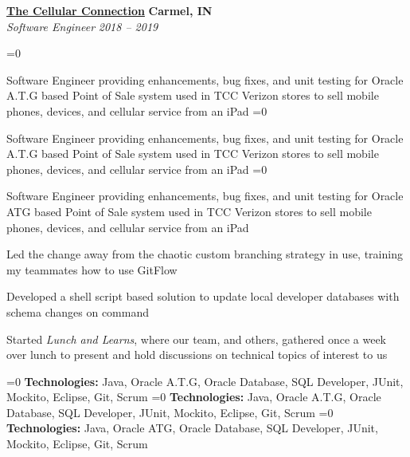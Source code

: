 %
    \headerrow
        {\textbf{\href{https://www.tccrocks.com/}{The Cellular Connection}}}
        {\textbf{Carmel, IN}}
    \\
    \headerrow
        {\emph{Software Engineer}}
        {\emph{2018 -- 2019}}
    \begin{itemize*}
        \ifnum{}=0
            \item Software Engineer providing enhancements, bug fixes, and unit testing for Oracle A.T.G
                based Point of Sale system used in TCC Verizon stores to sell mobile phones, devices, and cellular service from an iPad
        \fi
        \ifnum{}=0
            \item Software Engineer providing enhancements, bug fixes, and unit testing for Oracle A.T.G
                based Point of Sale system used in TCC Verizon stores to sell mobile phones, devices, and cellular service from an iPad
        \fi
        \ifnum{}=0
            \item Software Engineer providing enhancements, bug fixes, and unit testing for Oracle ATG
                based Point of Sale system used in TCC Verizon stores to sell mobile phones, devices, and cellular service from an iPad
        \fi
        \item Led the change away from the chaotic custom branching strategy in use, training my teammates how to use GitFlow
        \item Developed a shell script based solution to update local developer databases with schema changes on command
        \item Started \emph{Lunch and Learns}, where our team, and others, gathered once a week over lunch to present and hold
            discussions on technical topics of interest to us
    \end{itemize*}

    \ifnum{}=0
    \hspace{1.0em}
        {\textbf{Technologies:} Java, Oracle A.T.G, Oracle Database, SQL Developer, JUnit, Mockito, Eclipse, Git, Scrum}
    \fi
    \ifnum{}=0
    \hspace{1.0em}
        {\textbf{Technologies:} Java, Oracle A.T.G, Oracle Database, SQL Developer, JUnit, Mockito, Eclipse, Git, Scrum}
    \fi
    \ifnum{}=0
    \hspace{1.0em}
        {\textbf{Technologies:} Java, Oracle ATG, Oracle Database, SQL Developer, JUnit, Mockito, Eclipse, Git, Scrum}
    \fi


